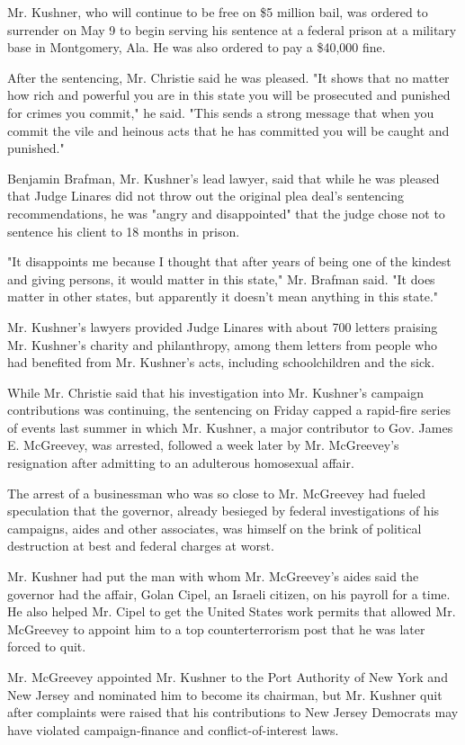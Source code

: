 Mr. Kushner, who will continue to be free on \$5 million bail, was
ordered to surrender on May 9 to begin serving his sentence at a federal
prison at a military base in Montgomery, Ala. He was also ordered to pay
a \$40,000 fine.

After the sentencing, Mr. Christie said he was pleased. "It shows that
no matter how rich and powerful you are in this state you will be
prosecuted and punished for crimes you commit," he said. "This sends a
strong message that when you commit the vile and heinous acts that he
has committed you will be caught and punished."

Benjamin Brafman, Mr. Kushner's lead lawyer, said that while he was
pleased that Judge Linares did not throw out the original plea deal's
sentencing recommendations, he was "angry and disappointed" that the
judge chose not to sentence his client to 18 months in prison.

"It disappoints me because I thought that after years of being one of
the kindest and giving persons, it would matter in this state," Mr.
Brafman said. "It does matter in other states, but apparently it doesn't
mean anything in this state."

Mr. Kushner's lawyers provided Judge Linares with about 700 letters
praising Mr. Kushner's charity and philanthropy, among them letters from
people who had benefited from Mr. Kushner's acts, including
schoolchildren and the sick.

While Mr. Christie said that his investigation into Mr. Kushner's
campaign contributions was continuing, the sentencing on Friday capped a
rapid-fire series of events last summer in which Mr. Kushner, a major
contributor to Gov. James E. McGreevey, was arrested, followed a week
later by Mr. McGreevey's resignation after admitting to an adulterous
homosexual affair.

The arrest of a businessman who was so close to Mr. McGreevey had fueled
speculation that the governor, already besieged by federal
investigations of his campaigns, aides and other associates, was himself
on the brink of political destruction at best and federal charges at
worst.

Mr. Kushner had put the man with whom Mr. McGreevey's aides said the
governor had the affair, Golan Cipel, an Israeli citizen, on his payroll
for a time. He also helped Mr. Cipel to get the United States work
permits that allowed Mr. McGreevey to appoint him to a top
counterterrorism post that he was later forced to quit.

Mr. McGreevey appointed Mr. Kushner to the Port Authority of New York
and New Jersey and nominated him to become its chairman, but Mr. Kushner
quit after complaints were raised that his contributions to New Jersey
Democrats may have violated campaign-finance and conflict-of-interest
laws.

